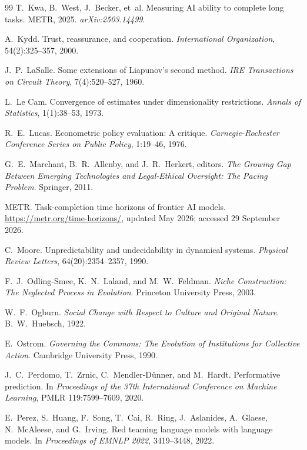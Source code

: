 \documentclass[11pt]{article}
\theoremstyle{plain}
\theoremstyle{definition}
\begin{document}
\begin{thebibliography}{99}
 T.~Kwa, B.~West, J.~Becker, et~al. Measuring AI ability to complete long tasks. METR, 2025. \emph{arXiv:2503.14499}.

 A.~Kydd. Trust, reassurance, and cooperation. \emph{International Organization}, 54(2):325--357, 2000.

 J.~P.~LaSalle. Some extensions of Liapunov's second method. \emph{IRE Transactions on Circuit Theory}, 7(4):520--527, 1960.

 L.~Le Cam. Convergence of estimates under dimensionality restrictions. \emph{Annals of Statistics}, 1(1):38--53, 1973.

 R.~E.~Lucas. Econometric policy evaluation: A critique. \emph{Carnegie-Rochester Conference Series on Public Policy}, 1:19--46, 1976.

 G.~E.~Marchant, B.~R.~Allenby, and J.~R.~Herkert, editors. \emph{The Growing Gap Between Emerging Technologies and Legal-Ethical Oversight: The Pacing Problem}. Springer, 2011.

 METR. Task-completion time horizons of frontier AI models. \url{https://metr.org/time-horizons/}, updated May 2026; accessed 29 September 2026.

 C.~Moore. Unpredictability and undecidability in dynamical systems. \emph{Physical Review Letters}, 64(20):2354--2357, 1990.

 F.~J.~Odling-Smee, K.~N.~Laland, and M.~W.~Feldman. \emph{Niche Construction: The Neglected Process in Evolution}. Princeton University Press, 2003.

 W.~F.~Ogburn. \emph{Social Change with Respect to Culture and Original Nature}. B.~W.~Huebsch, 1922.

 E.~Ostrom. \emph{Governing the Commons: The Evolution of Institutions for Collective Action}. Cambridge University Press, 1990.

 J.~C.~Perdomo, T.~Zrnic, C.~Mendler-D\"unner, and M.~Hardt. Performative prediction. In \emph{Proceedings of the 37th International Conference on Machine Learning}, PMLR 119:7599--7609, 2020.

 E.~Perez, S.~Huang, F.~Song, T.~Cai, R.~Ring, J.~Aslanides, A.~Glaese, N.~McAleese, and G.~Irving. Red teaming language models with language models. In \emph{Proceedings of EMNLP 2022}, 3419--3448, 2022.


\end{thebibliography}
\end{document}
